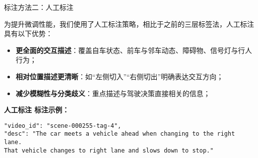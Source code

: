 \documentclass[serif]{beamer}
\begin{document}
\begin{frame}{标注方法二：人工标注}

\small
为提升微调性能，我们使用了人工标注策略，相比于之前的三层标签法，人工标注具有以下优势：

\small
\begin{itemize}
  \item \textbf{更全面的交互描述}：覆盖自车状态、前车与邻车动态、障碍物、信号灯与行人行为；
  \item \textbf{相对位置描述更清晰}：如“左侧切入”“右侧切出”明确表达交互方向；
  \item \textbf{减少模糊性与分类歧义}：重点描述与驾驶决策直接相关的信息；
 
\end{itemize}
\normalsize

\textbf{人工标注 标注示例：}

\texttt{\quad "video\_id": "scene-000255-tag-4",}\\
\texttt{\quad "desc": "The car meets a vehicle ahead when changing to the right lane.}\\
\texttt{\quad\quad That vehicle changes to right lane and slows down to stop."}

\end{frame}
\end{document}
